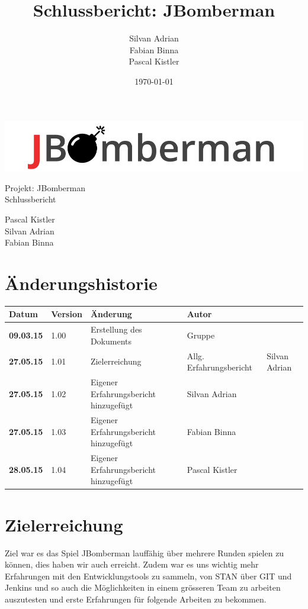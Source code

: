 \documentclass[11pt]{scrartcl}
\title{Schlussbericht: JBomberman}
\author{Silvan Adrian \\ Fabian Binna \\ Pascal Kistler}
\date{\today{}}
\begin{document}
\def\arraystretch{1.5}
\begin{titlepage}
\begin{center}
\vspace{10em}
\includegraphics[scale=2]{jbomberman}
\vspace{10em}
\end{center}
\begin{center}
\huge {Projekt: JBomberman} \\
\huge {Schlussbericht}
\end{center}
\begin{center}
\vspace{10em}
\LARGE {Pascal Kistler} \\
\LARGE {Silvan Adrian} \\
\LARGE {Fabian Binna}
\end{center}

\end{titlepage}

\newpage
\section{Änderungshistorie}
\label{sec:Änderungen}

\begin{tabularx}{\linewidth}{l l l l}
\textbf{Datum} & \textbf{Version} & \textbf{Änderung}  & \textbf{Autor} \\
\hline
\textbf{09.03.15} & 1.00 & Erstellung des Dokuments & Gruppe \\
\textbf{27.05.15} & 1.01 & Zielerreichung & Allg. Erfahrungsbericht & Silvan 
Adrian\\
\textbf{27.05.15} & 1.02 & Eigener Erfahrungsbericht hinzugefügt & Silvan 
Adrian\\
\textbf{27.05.15} & 1.03 & Eigener Erfahrungsbericht hinzugefügt & Fabian Binna\\
\textbf{28.05.15} & 1.04 & Eigener Erfahrungsbericht hinzugefügt & Pascal Kistler
\end{tabularx}

\newpage
\tableofcontents
\newpage

\section{Zielerreichung}
Ziel war es das Spiel JBomberman lauffähig über mehrere Runden spielen zu 
können, dies haben wir auch erreicht.
Zudem war es uns wichtig mehr Erfahrungen mit den Entwicklungstools zu sammeln,
von STAN über GIT und Jenkins und so auch die Möglichkeiten 
in einem grösseren Team zu arbeiten auszutesten und erste Erfahrungen 
für folgende Arbeiten zu bekommen.
\end{document}
